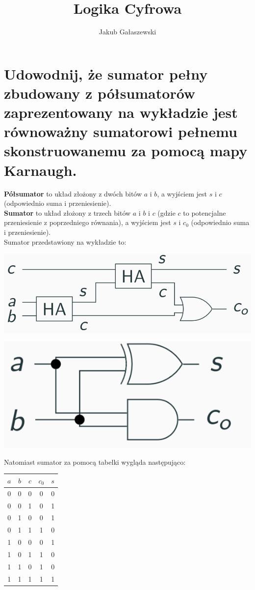 \documentclass{article}
\title{Logika Cyfrowa}
\author{Jakub Gałaszewski}
\begin{document}
\maketitle
\section{Udowodnij, że sumator pełny zbudowany z półsumatorów zaprezentowany na wykładzie jest równoważny sumatorowi pełnemu skonstruowanemu za pomocą mapy Karnaugh.}
 \textbf{Półsumator} to układ złożony z dwóch bitów $a$ i $b$, a wyjściem jest $s$ i $c$ (odpowiednio suma i przeniesienie).\\
\textbf{Sumator} to układ złożony z trzech bitów $a$ i $b$ i $c$ (gdzie $c$ to potencjalne przeniesienie z poprzedniego równania), a wyjściem jest $s$ i $c_0$ (odpowiednio suma i przeniesienie).\\
Sumator przedstawiony na wykładzie to:
\begin{center}
\includegraphics[scale=0.5]{./L03Z01.png}

\includegraphics[scale=0.5]{./L03Z01czII.png}
\end{center}
Natomiast sumator za pomocą tabelki wygląda następująco:\\
	\begin{tabular}{|c|c|c||c|c|} 
	 \hline
	$a$ & $b$ & $c$ & $c_0$ & $s$\\ 
	 \hline \hline
	 0&0&0&0&0\\ \hline
	 0&0&1&0&1\\ \hline
	 0&1&0&0&1\\ \hline
	 0&1&1&1&0\\ \hline
	 1&0&0&0&1\\ \hline	 
	 1&0&1&1&0\\ \hline
	 1&1&0&1&0\\ \hline
	 1&1&1&1&1\\ \hline
	\end{tabular}
\end{document}
